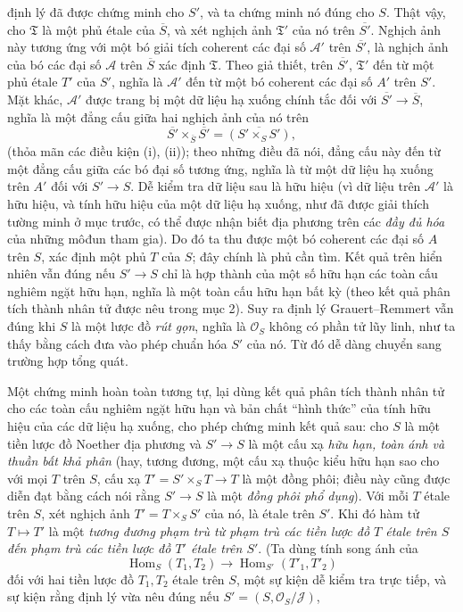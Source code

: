 định lý đã được chứng minh cho $S'$, và ta chứng minh nó đúng cho $S$. Thật vậy,
cho $\mathfrak T$ là một phủ étale của $\overline S$, và xét nghịch ảnh
$\mathfrak T'$ của nó trên $\overline{S'}$. Nghịch ảnh này tương ứng với một bó
giải tích coherent các đại số $\mathcal A'$ trên $\overline{S'}$, là nghịch ảnh
của bó các đại số $\mathcal A$ trên $\overline S$ xác định $\mathfrak T$. Theo giả
thiết, trên $\overline{S'}$, $\mathfrak T'$ đến từ một phủ étale $T'$ của $S'$,
nghĩa là $\mathcal A'$ đến từ một bó coherent các đại số $A'$ trên $S'$. Mặt
khác, $\mathcal A'$ được trang bị một dữ liệu hạ xuống chính tắc đối với
$\overline{S'}\longrightarrow\overline S$, nghĩa là một đẳng cấu giữa hai
nghịch ảnh của nó trên
\[
  \overline{S'}\times_{\overline S}\overline{S'}
  =\overline{(S'\times_SS')},
\]
(thỏa mãn các điều kiện (i), (ii)); theo những điều đã nói, đẳng cấu này đến từ
một đẳng cấu giữa các bó đại số tương ứng, nghĩa là từ một dữ liệu hạ xuống
trên $A'$ đối với $S'\longrightarrow S$. Dễ kiểm tra dữ liệu sau là hữu hiệu
(vì dữ liệu trên $\mathcal A'$ là hữu hiệu, và tính hữu hiệu của một dữ liệu hạ
xuống, như đã được giải thích tường minh ở mục trước, có thể được nhận biết địa
phương trên các \emph{đầy đủ hóa} của những môđun tham gia). Do đó ta thu
được một bó coherent các đại số $A$ trên $S$, xác định một phủ $T$ của $S$;
đây chính là phủ cần tìm. Kết quả trên hiển nhiên vẫn đúng nếu
$S'\longrightarrow S$ chỉ là hợp thành của một số hữu hạn các toàn cấu nghiêm
ngặt hữu hạn, nghĩa là một toàn cấu hữu hạn bất kỳ (theo kết quả phân tích thành
nhân tử được nêu trong mục 2). Suy ra định lý Grauert--Remmert vẫn đúng khi $S$
là một lược đồ \emph{rút gọn}, nghĩa là $\mathcal O_S$ không có phần tử lũy
linh, như ta thấy bằng cách đưa vào phép chuẩn hóa $S'$ của nó. Từ đó dễ dàng
chuyển sang trường hợp tổng quát.

Một chứng minh hoàn toàn tương tự, lại dùng kết quả phân tích thành nhân tử cho
các toàn cấu nghiêm ngặt hữu hạn và bản chất ``hình thức'' của tính hữu hiệu của
các dữ liệu hạ xuống, cho phép chứng minh kết quả sau: cho $S$ là một tiền lược
đồ Noether địa phương và $S'\longrightarrow S$ là một cấu xạ \emph{hữu hạn,
toàn ánh và thuần bất khả phân} (hay, tương đương, một cấu xạ thuộc kiểu hữu hạn
sao cho với mọi $T$ trên $S$, cấu xạ
$T'=S'\times_ST\longrightarrow T$ là một đồng phôi; điều này cũng được diễn đạt
bằng cách nói rằng $S'\longrightarrow S$ là một \emph{đồng phôi phổ dụng}). Với
mỗi $T$ étale trên $S$, xét nghịch ảnh $T'=T\times_SS'$ của nó, là étale trên
$S'$. Khi đó hàm tử $T\longmapsto T'$ là một \emph{tương đương phạm trù từ
phạm trù các tiền lược đồ $T$ étale trên $S$ đến phạm trù các tiền lược đồ $T'$
étale trên $S'$}. (Ta dùng tính song ánh của
\[
  \operatorname{Hom}_S(T_1,T_2)\longrightarrow
  \operatorname{Hom}_{S'}(T'_1,T'_2)
\]
đối với hai tiền lược đồ $T_1,T_2$ étale trên $S$, một sự kiện dễ kiểm tra trực
tiếp, và sự kiện rằng định lý vừa nêu đúng nếu
$S'=(S,\mathcal O_S/\mathcal J)$,

